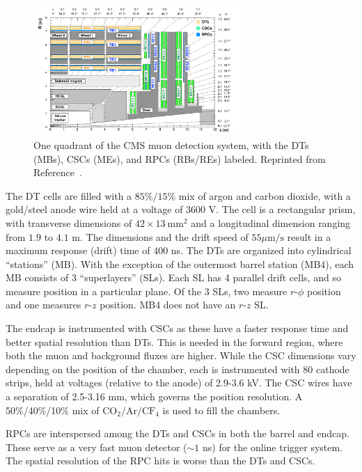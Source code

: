 \begin{figure}[]
	\begin{center}
		\includegraphics[width=0.7\textwidth]{figures/cms/muon.png}
		\caption{One quadrant of the CMS muon detection system, with the DTs (MBs), CSCs (MEs), and RPCs (RBs/REs) labeled. 
				 Reprinted from Reference~\cite{cmsmuon}.}
		\label{fig:cms:muondet}
	\end{center}
\end{figure}

The DT cells are filled with a $85\%/15\%$ mix of argon and carbon dioxide, with a gold/steel anode wire held at a voltage of $3600$ V.
The cell is a rectangular prism, with transverse dimensions of $42\times13~\mathrm{mm}^2$ and a longitudinal dimension ranging from $1.9$ to $4.1$ m.
The dimensions and the drift speed of $55\mu\mathrm{m/s}$ result in a maximum response (drift) time of $400$ ns.
The DTs are organized into cylindrical ``stations'' (MB).
With the exception of the outermost barrel station (MB4), each MB consists of 3 ``superlayers'' (SLs).
Each SL has 4 parallel drift cells, and so measure position in a particular plane.
Of the 3 SLs, two measure $r$-$\phi$ position and one measures $r$-$z$ position. 
MB4 does not have an $r$-$z$ SL.

The endcap is instrumented with CSCs as these have a faster response time and better spatial resolution than DTs.
This is needed in the forward region, where both the muon and background fluxes are higher.
While the CSC dimensions vary depending on the position of the chamber, each is instrumented with 80 cathode strips, held at voltages (relative to the anode) of 2.9-3.6 kV.
The CSC wires have a separation of 2.5-3.16 mm, which governs the position resolution.
A 50\%/40\%/10\% mix of $\mathrm{CO}_2/\mathrm{Ar}/\mathrm{CF}_4$ is used to fill the chambers.

RPCs are interspersed among the DTs and CSCs in both the barrel and endcap. 
These serve as a very fast muon detector ($\sim 1$ ns) for the online trigger system. 
The spatial resolution of the RPC hits is worse than the DTs and CSCs.

